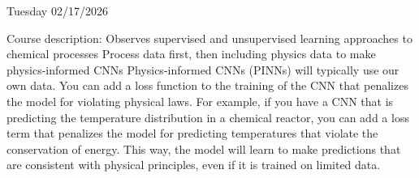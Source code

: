 Tuesday 02/17/2026


Course description:
Observes supervised and unsupervised learning approaches to chemical processes
Process data first, then including physics data to make physics-informed CNNs
Physics-informed CNNs (PINNs) will typically use our own data. You can add a loss function to the training of the CNN that penalizes the model for violating physical laws. For example, if you have a CNN that is predicting the temperature distribution in a chemical reactor, you can add a loss term that penalizes the model for predicting temperatures that violate the conservation of energy. This way, the model will learn to make predictions that are consistent with physical principles, even if it is trained on limited data.



